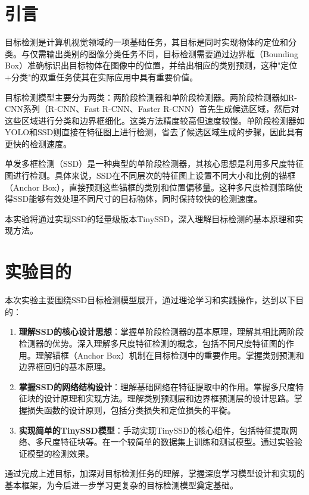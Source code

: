 \documentclass[UTF8]{ctexart}
\begin{document}
\tableofcontents  %


\newpage
\section{引言}

目标检测是计算机视觉领域的一项基础任务，其目标是同时实现物体的定位和分类。与仅需输出类别的图像分类任务不同，目标检测需要通过边界框（Bounding Box）准确标识出目标物体在图像中的位置，并给出相应的类别预测，这种"定位+分类"的双重任务使其在实际应用中具有重要价值。

目标检测模型主要分为两类：两阶段检测器和单阶段检测器。两阶段检测器如R-CNN系列（R-CNN、Fast R-CNN、Faster R-CNN）首先生成候选区域，然后对这些区域进行分类和边界框细化。这类方法精度较高但速度较慢。单阶段检测器如YOLO和SSD则直接在特征图上进行检测，省去了候选区域生成的步骤，因此具有更快的检测速度。

单发多框检测（SSD）是一种典型的单阶段检测器，其核心思想是利用多尺度特征图进行检测。具体来说，SSD在不同层次的特征图上设置不同大小和比例的锚框（Anchor Box），直接预测这些锚框的类别和位置偏移量。这种多尺度检测策略使得SSD能够有效处理不同尺寸的目标物体，同时保持较快的检测速度。

本实验将通过实现SSD的轻量级版本TinySSD，深入理解目标检测的基本原理和实现方法。

\section{实验目的}
本次实验主要围绕SSD目标检测模型展开，通过理论学习和实践操作，达到以下目的：
\begin{enumerate}
 \item \textbf{理解SSD的核心设计思想}：掌握单阶段检测器的基本原理，理解其相比两阶段检测器的优势。深入理解多尺度特征检测的概念，包括不同尺度特征图的作用。理解锚框（Anchor Box）机制在目标检测中的重要作用。掌握类别预测和边界框回归的基本原理。
    \item \textbf{掌握SSD的网络结构设计}：理解基础网络在特征提取中的作用。掌握多尺度特征块的设计原理和实现方法。理解类别预测层和边界框预测层的设计思路。掌握损失函数的设计原则，包括分类损失和定位损失的平衡。
    \item \textbf{实现简单的TinySSD模型}：手动实现TinySSD的核心组件，包括特征提取网络、多尺度特征块等。在一个较简单的数据集上训练和测试模型。通过实验验证模型的检测效果。
\end{enumerate}

通过完成上述目标，加深对目标检测任务的理解，掌握深度学习模型设计和实现的基本框架，为今后进一步学习更复杂的目标检测模型奠定基础。
\end{document}
